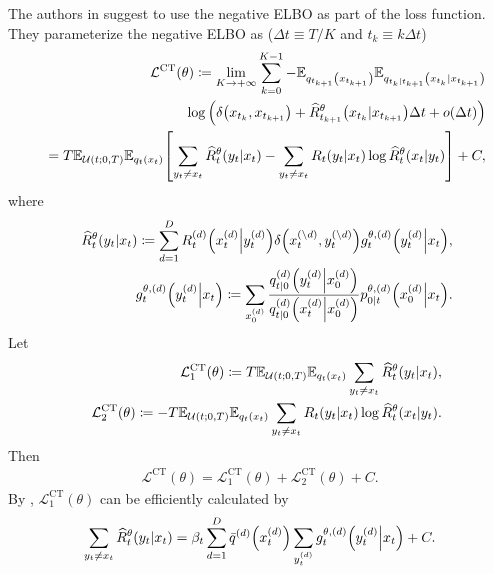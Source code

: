 \documentclass{article}
\begin{document}
The authors in \cite{zhao2024unified} suggest to use the negative ELBO as part of the loss function. They parameterize the negative ELBO as ($\Delta t\equiv T / K$ and $t_k\equiv k\Delta t$)
\begin{eqnarray*}
  &&\mathcal{L}^\text{CT}(\theta)\coloneq \lim_{K\to+\infty}\sum_{k=0}^{K-1} - \mathbb{E}_{q_{t_{k+1}}\qty(x_{t_{k+1}})}\mathbb{E}_{q_{t_k|t_{k+1}}\qty(x_{t_k}|x_{t_{k+1}})}\nonumber\\
  &&\log \qty(\delta\qty(x_{t_k},x_{t_{k+1}}) + \widehat{R}_{t_{k+1}}^\theta\qty(x_{t_k}|x_{t_{k+1}})\Delta t + o(\Delta t))\\
  &&= T\mathbb{E}_{\mathcal{U}(t;0,T)}\mathbb{E}_{q_t\qty(x_t)}\qty[\sum_{y_t\neq x_t}\widehat{R}_t^\theta\qty(y_t\middle|x_t) - \sum_{y_t\neq x_t}R_t\qty(y_t\middle|x_t)\log\widehat{R}_t^\theta\qty(x_t\middle|y_t)] + C,
\end{eqnarray*}
where
\begin{eqnarray}
  &&\widehat{R}^\theta_t\qty(y_t\middle|x_t)\coloneqq\sum_{d=1}^D R^{(d)}_t\qty(x^{(d)}_t\middle| y^{(d)}_t)\delta\qty(x^{(\setminus d)}_t,y^{(\setminus d)}_t) g^{\theta,(d)}_t\qty(y^{(d)}_t\middle|x_t),\label{eq:RthetaSingle}\\
  &&g^{\theta,(d)}_t\qty(y^{(d)}_t\middle|x_t)\coloneq\sum_{x^{(d)}_0}\frac{q^{(d)}_{t|0}\qty(y^{(d)}_t\middle|x^{(d)}_0)}{q^{(d)}_{t|0}\qty(x^{(d)}_t\middle|x^{(d)}_0)}p^{\theta,(d)}_{0|t}\qty(x^{(d)}_0\middle| x_t).
\end{eqnarray}
Let
\begin{eqnarray*}
  &&\mathcal{L}_1^\text{CT}(\theta) \coloneqq T\mathbb{E}_{\mathcal{U}(t;0,T)}\mathbb{E}_{q_t\qty(x_t)}\sum_{y_t\neq x_t}\widehat{R}^\theta_t\qty(y_t\middle|x_t),\\
  &&\mathcal{L}_2^\text{CT}(\theta) \coloneqq -T\mathbb{E}_{\mathcal{U}(t;0,T)}\mathbb{E}_{q_t\qty(x_t)} \sum_{y_t\neq x_t}R_t\qty(y_t\middle|x_t)\log\widehat{R}_t^\theta\qty(x_t\middle|y_t).
\end{eqnarray*}
Then
\begin{eqnarray*}
  \mathcal{L}^\text{CT}(\theta) = \mathcal{L}_1^\text{CT}(\theta) + \mathcal{L}_2^\text{CT}(\theta) + C.
\end{eqnarray*}
By \cite{zhao2024unified}, $\mathcal{L}_1^\text{CT}(\theta)$ can be efficiently calculated by
\begin{eqnarray}\label{eq:LossFirstTerm}
  \sum_{y_t\neq x_t}\widehat{R}_t^\theta\qty(y_t|x_t)=\beta_t\sum_{d=1}^D\bar{q}^{(d)}\qty(x^{(d)}_t)\sum_{y^{(d)}_t}g^{\theta,(d)}_t\qty(y^{(d)}_t\middle|x_t) + C.
\end{eqnarray}
\end{document}
